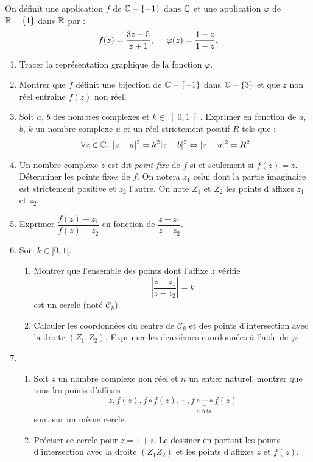 On définit une application $f$ de $\mathbb{C}-\{-1\}$ dans $\mathbb{C}$ et une application $\varphi$  de $\mathbb{R} -\{1\}$ dans $\mathbb{R}$ par :
\[
 f(z) = \frac{3z -5}{z+1}, \hspace{0.5cm}  \varphi(z) = \frac{1+z}{1-z}.
\]

\begin{enumerate}
 \item Tracer la représentation graphique de la fonction $\varphi$.

 \item Montrer que $f$ définit une bijection de $\mathbb{C}-\{-1\}$ dans $\mathbb{C}-\{3\}$ et que $z$ non réel entraine $f(z)$ non réel.

 \item Soit $a$, $b$ des nombres complexes et $k\in \left]0,1\right[$. Exprimer en fonction de $a$, $b$, $k$ un nombre complexe $u$ et un réel strictement positif $R$ tels que :
\begin{displaymath}
 \forall z \in \mathbb{C}, \; |z-a|^2 = k^2 |z-b|^2 \Leftrightarrow |z-u|^2 = R^2
\end{displaymath}


 \item  Un nombre complexe $z$ est dit \emph{point fixe} de $f$ si et seulement si $f(z)=z$.\newline
Déterminer les points fixes de $f$. On notera $z_1$ celui dont la partie imaginaire est strictement positive et $z_2$ l'autre. On note $Z_1$ et $Z_2$ les points d'affixes $z_1$ et $z_2$.

\item Exprimer $\dfrac{f(z)-z_1}{f(z)-z_2}$ en fonction de $\dfrac{z-z_1}{z-z_2}$.

 \item Soit $k\in]0,1[$. \begin{enumerate}
 \item Montrer que l'ensemble des points dont l'affixe $z$ vérifie 
\begin{displaymath}
 \left \vert \dfrac{z-z_1}{z-z_2}\right \vert = k 
\end{displaymath}
est un cercle (noté $\mathcal C_k$).
\item Calculer les coordonnées du centre de $\mathcal C_k$ et des points d'intersection avec la droite $(Z_1,Z_2)$. Exprimer les deuxièmes coordonnées à l'aide de $\varphi$.
\end{enumerate}

\item \begin{enumerate}
\item Soit $z$ un nombre complexe non réel et $n$ un entier naturel, montrer que tous les points d'affixes 
\begin{displaymath}
 z, f(z), f\circ f(z), \cdots , \underset{n\text{ fois }}{\underbrace{f\circ \cdots \circ f}}(z)
\end{displaymath}
sont sur un même cercle.
\item Préciser ce cercle pour $z=1+i$. Le dessiner en portant les points d'intersection avec la droite $(Z_1Z_2)$ et les points d'affixes $z$ et $f(z)$.
\end{enumerate}
\end{enumerate}
